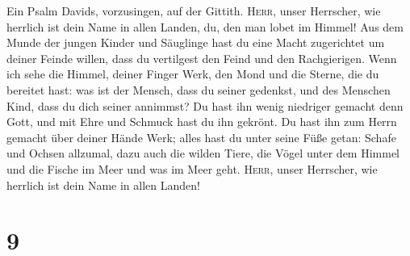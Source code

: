  Ein Psalm Davids, vorzusingen, auf der Gittith.
 \textsc{Herr}, unser Herrscher, wie herrlich ist dein
Name in allen Landen, du, den man lobet im Himmel!  Aus
dem Munde der jungen Kinder und Säuglinge hast du eine Macht zugerichtet
um deiner Feinde willen, dass du vertilgest den Feind und den
Rachgierigen.  Wenn ich sehe die Himmel, deiner Finger
Werk, den Mond und die Sterne, die du bereitet hast:  was
ist der Mensch, dass du seiner gedenkst, und des Menschen Kind, dass du
dich seiner annimmst?  Du hast ihn wenig niedriger gemacht
denn Gott, und mit Ehre und Schmuck hast du ihn gekrönt. 
Du hast ihn zum Herrn gemacht über deiner Hände Werk; alles hast du
unter seine Füße getan:  Schafe und Ochsen allzumal, dazu
auch die wilden Tiere,  die Vögel unter dem Himmel und die
Fische im Meer und was im Meer geht.  \textsc{Herr},
unser Herrscher, wie herrlich ist dein Name in allen Landen!

\hypertarget{section-8}{%
\section{9}\label{section-8}}

